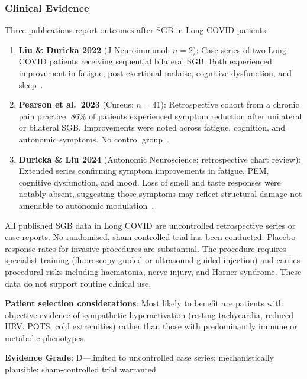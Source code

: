 \subsubsection{Clinical Evidence}

Three publications report outcomes after SGB in Long COVID patients:

\begin{enumerate}
    \item \textbf{Liu \& Duricka 2022} (J Neuroimmunol; $n=2$): Case series of two Long COVID patients receiving sequential bilateral SGB. Both experienced improvement in fatigue, post-exertional malaise, cognitive dysfunction, and sleep~\cite{Liu2022SGB}.
    \item \textbf{Pearson et al.\ 2023} (Cureus; $n=41$): Retrospective cohort from a chronic pain practice. 86\% of patients experienced symptom reduction after unilateral or bilateral SGB. Improvements were noted across fatigue, cognition, and autonomic symptoms. No control group~\cite{Pearson2023SGB}.
    \item \textbf{Duricka \& Liu 2024} (Autonomic Neuroscience; retrospective chart review): Extended series confirming symptom improvements in fatigue, PEM, cognitive dysfunction, and mood. Loss of smell and taste responses were notably absent, suggesting those symptoms may reflect structural damage not amenable to autonomic modulation~\cite{Duricka2024SGB}.
\end{enumerate}

\begin{warning}
All published SGB data in Long COVID are uncontrolled retrospective series or case reports. No randomised, sham-controlled trial has been conducted. Placebo response rates for invasive procedures are substantial. The procedure requires specialist training (fluoroscopy-guided or ultrasound-guided injection) and carries procedural risks including haematoma, nerve injury, and Horner syndrome. These data do not support routine clinical use.
\end{warning}

\textbf{Patient selection considerations}: Most likely to benefit are patients with objective evidence of sympathetic hyperactivation (resting tachycardia, reduced HRV, POTS, cold extremities) rather than those with predominantly immune or metabolic phenotypes.

\textbf{Evidence Grade}: D---limited to uncontrolled case series; mechanistically plausible; sham-controlled trial warranted

